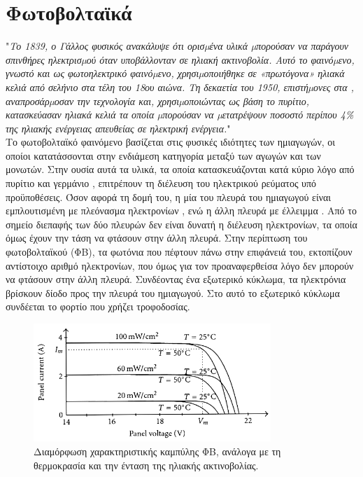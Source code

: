 \documentclass[12pt]{report}
\begin{document}
\section{Φωτοβολταϊκά}
"{\textit{Το 1839, ο Γάλλος φυσικός {} ανακάλυψε ότι ορισµένα υλικά µπορούσαν να παράγουν σπινθήρες ηλεκτρισµού όταν υποβάλλονταν σε ηλιακή ακτινοβολία. Αυτό το φαινόµενο, γνωστό και ως φωτοηλεκτρικό
φαινόµενο, χρησιµοποιήθηκε σε «πρωτόγονα» ηλιακά κελιά από σελήνιο στα τέλη του 18ου αιώνα. Τη δεκαετία του 1950, επιστήµονες στα {}, αναπροσάρµοσαν την τεχνολογία και, χρησιµοποιώντας ως βάση το
πυρίτιο, κατασκεύασαν ηλιακά κελιά τα οποία µπορούσαν να µετατρέψουν ποσοστό περίπου 4\% της ηλιακής ενέργειας απευθείας σε ηλεκτρική ενέργεια.}}" \parencite{teetkm2011}
\\[10pt]
Το φωτοβολταϊκό φαινόμενο βασίζεται στις φυσικές ιδιότητες των ημιαγωγών, οι οποίοι κατατάσσονται στην ενδιάμεση κατηγορία μεταξύ των αγωγών και των μονωτών. Στην ουσία αυτά τα υλικά, τα οποία κατασκευάζονται κατά κύριο λόγο
από πυρίτιο {} και γερμάνιο {}, επιτρέπουν τη διέλευση του ηλεκτρικού ρεύματος υπό προϋποθέσεις. Όσον αφορά τη δομή του, η μία του πλευρά του ημιαγωγού είναι εμπλουτισμένη με πλεόνασμα ηλεκτρονίων 
{}, ενώ η άλλη πλευρά με έλλειμμα {}. Από το σημείο διεπαφής {} των δύο πλευρών δεν είναι δυνατή η διέλευση ηλεκτρονίων, τα οποία όμως έχουν την τάση να φτάσουν στην άλλη πλευρά.
Στην περίπτωση του φωτοβολταϊκού (ΦΒ), τα φωτόνια που πέφτουν πάνω στην επιφάνειά του, εκτοπίζουν αντίστοιχο αριθμό ηλεκτρονίων, που όμως για τον προαναφερθείσα λόγο δεν μπορούν να φτάσουν στην άλλη πλευρά. Συνδέοντας ένα εξωτερικό 
κύκλωμα, τα ηλεκτρόνια βρίσκουν δίοδο προς την {} πλευρά του ημιαγωγού. Στο αυτό το εξωτερικό κύκλωμα συνδέεται το φορτίο που χρήζει τροφοδοσίας.

\begin{figure}[h]
				\center
				\includegraphics[width=0.8\textwidth]{ivcurve}
				\captionsetup{width=0.9\textwidth}
				\caption{Διαμόρφωση χαρακτηριστικής καμπύλης {} ΦΒ, ανάλογα με τη θερμοκρασία και την ένταση της ηλιακής ακτινοβολίας.}
				\label{fig:ivcurve}
\end{figure}
\end{document}
